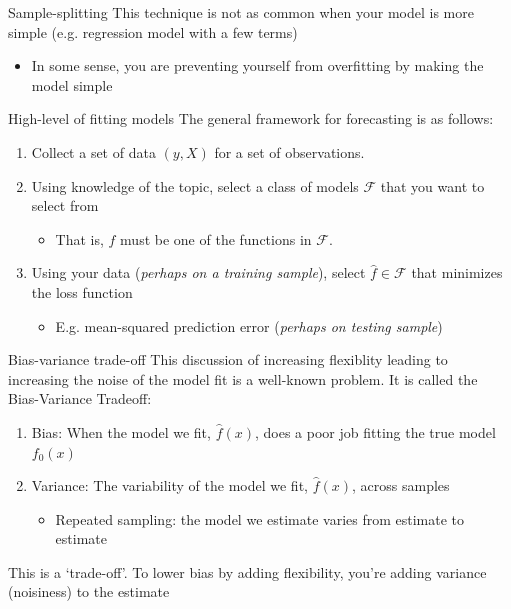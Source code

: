 \documentclass[aspectratio=169,t,11pt,table]{beamer}
\begin{document}
\begin{frame}{Sample-splitting}  
  This technique is not as common when your model is more simple (e.g. regression model with a few terms)
  \begin{itemize}
    \item In some sense, you are preventing yourself from overfitting by making the model simple
  \end{itemize}
\end{frame}

\begin{frame}{High-level of fitting models}
  The general framework for forecasting is as follows:
  \begin{enumerate}
    \item Collect a set of data $(y, X)$ for a set of observations.
    
    \item Using knowledge of the topic, select a \alert{class} of models $\mathcal{F}$ that you want to select from
    \begin{itemize}
      \item That is, $\hat{f}$ must be one of the functions in $\mathcal{F}$.
    \end{itemize}
    
    \item Using your data (\emph{perhaps on a training sample}), select $\hat{f} \in \mathcal{F}$ that minimizes the \alert{loss function}
    \begin{itemize}
      \item E.g. mean-squared prediction error (\emph{perhaps on testing sample})
    \end{itemize}
  \end{enumerate}
\end{frame}

\begin{frame}{Bias-variance trade-off}
  This discussion of increasing flexiblity leading to increasing the noise of the model fit is a well-known problem. It is called the \alert{Bias-Variance Tradeoff}:
  \begin{enumerate}
    \item \alert{Bias}: When the model we fit, $\hat{f}(x)$, does a poor job fitting the true model $f_0(x)$
    
    \item \alert{Variance}: The variability of the model we fit, $\hat{f}(x)$, across samples
    \begin{itemize}
      \item Repeated sampling: the model we estimate varies from estimate to estimate
    \end{itemize}
  \end{enumerate}

  \pause
  \bigskip
  This is a `trade-off'. To lower bias by adding flexibility, you're adding variance (noisiness) to the estimate 
\end{frame}
\end{document}
